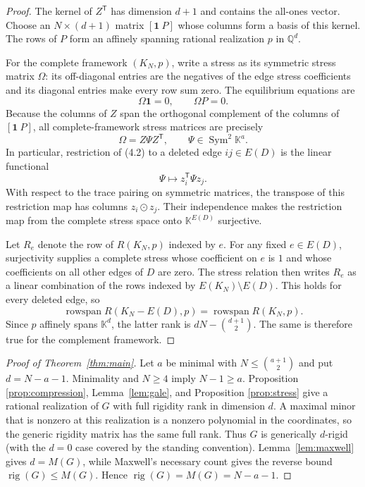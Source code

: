 \documentclass[11pt]{article}
\newcommand{\K}{\mathbb{K}}
\newcommand{\Sym}{\operatorname{Sym}}
\newcommand{\rig}{\operatorname{rig}}
\begin{document}
\begin{proof}
The kernel of $Z^{\mathsf T}$ has dimension $d+1$ and contains the all-ones
vector.  Choose an $N\times(d+1)$ matrix $[\mathbf1\ P]$ whose columns form
a basis of this kernel.  The rows of $P$ form an affinely spanning rational
realization $p$ in $\mathbb Q^d$.

For the complete framework $(K_N,p)$, write a stress as its symmetric stress
matrix $\Omega$: its off-diagonal entries are the negatives of the edge
stress coefficients and its diagonal entries make every row sum zero.  The
equilibrium equations are
\[
 \Omega\mathbf1=0,\qquad \Omega P=0.
\]
Because the columns of $Z$ span the orthogonal complement of the columns of
$[\mathbf1\ P]$, all complete-framework stress matrices are precisely
\[
 \Omega=Z\Psi Z^{\mathsf T},\qquad \Psi\in\Sym^2\K^a.
 \tag{4.2}
\]
In particular, restriction of (4.2) to a deleted edge $ij\in E(D)$ is the
linear functional
\[
 \Psi\longmapsto z_i^{\mathsf T}\Psi z_j.
\]
With respect to the trace pairing on symmetric matrices, the transpose of
this restriction map has columns $z_i\odot z_j$.  Their independence makes
the restriction map from the complete stress space onto
$\K^{E(D)}$ surjective.

Let $R_e$ denote the row of $R(K_N,p)$ indexed by $e$.  For any fixed
$e\in E(D)$, surjectivity supplies a complete stress whose coefficient on
$e$ is $1$ and whose coefficients on all other edges of $D$ are zero.  The
stress relation then writes $R_e$ as a linear combination of the rows
indexed by $E(K_N)\setminus E(D)$.  This holds for every deleted edge, so
\[
 \operatorname{rowspan}R(K_N-E(D),p)
 =\operatorname{rowspan}R(K_N,p).
\]
Since $p$ affinely spans $\K^d$, the latter rank is
$dN-\binom{d+1}{2}$.  The same is therefore true for the complement
framework.
\end{proof}

\begin{proof}[Proof of Theorem~\ref{thm:main}]
Let $a$ be minimal with $N\leq\binom{a+1}{2}$ and put $d=N-a-1$.
Minimality and $N\geq4$ imply $N-1\geq a$.  Proposition
\ref{prop:compression}, Lemma~\ref{lem:gale}, and Proposition
\ref{prop:stress} give a rational realization of $G$ with full rigidity
rank in dimension $d$.  A maximal minor that is nonzero at this realization
is a nonzero polynomial in the coordinates, so the generic rigidity matrix
has the same full rank.  Thus $G$ is generically $d$-rigid (with the
$d=0$ case covered by the standing convention).  Lemma~\ref{lem:maxwell}
gives $d=M(G)$, while Maxwell's necessary count gives the reverse bound
$\rig(G)\leq M(G)$.  Hence $\rig(G)=M(G)=N-a-1$.
\end{proof}
\end{document}
